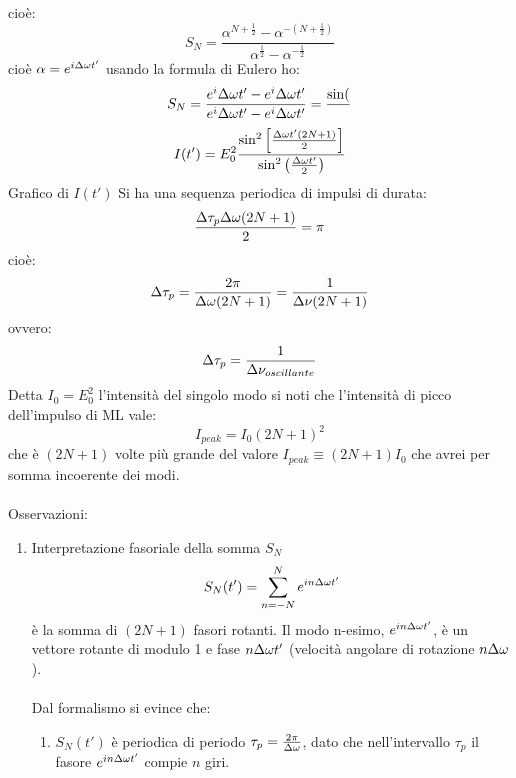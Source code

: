 \begin{enumerate}
cioè:
\begin{equation*}
S_N = \frac{\alpha^{N+\frac{1}{2}} - \alpha^{-(N+\frac{1}{2})}}{\alpha^\frac{1}{2} - \alpha^{-\frac{1}{2}}}
\end{equation*}
cioè $\alpha = e^{i\Delta \omega t'}$ usando la formula di Eulero ho:
\begin{equation*}
S_N = \frac{e^i\Delta \omega t' -e^i\Delta \omega t'}{e^i\Delta \omega t' - e^i\Delta \omega t'} = \frac{\sin(}{}
\end{equation*}
\begin{equation*}
I(t') = E_0^2 \frac{\sin^2 \left[\frac{\Delta \omega t' (2N+1)}{2}\right]}{\sin^2 \left(\frac{\Delta\omega t'}{2}\right)}
\end{equation*}
Grafico di $I(t')$
Si ha una sequenza periodica di impulsi di durata:
\begin{equation*}
\frac{\Delta\tau_p \Delta\omega (2N+1)}{2} = \pi
\end{equation*}
cioè:
\begin{equation*}
\Delta\tau_p = \frac{2\pi}{\Delta\omega (2N+1)} = \frac{1}{\Delta\nu(2N+1)}
\end{equation*}
ovvero:
\begin{equation*}
\Delta\tau_p = \frac{1}{\Delta\nu_{oscillante}}
\end{equation*}
Detta $I_0 = E_0^2$ l'intensità del singolo modo si noti che l'intensità di picco dell'impulso di ML vale:
\begin{equation*}
I_{peak} = I_0 (2N+1)^2
\end{equation*}
che è $(2N+1)$ volte più grande del valore $I_{peak} \equiv (2N+1) I_0$ che avrei per somma incoerente dei modi.\\
\\
Osservazioni:
\begin{enumerate}
\item Interpretazione fasoriale della somma $S_N$
\begin{equation*}
S_N(t') = \sum_{n=-N}^N e^{in\Delta\omega t'}
\end{equation*}
è la somma di $(2N+1)$ fasori rotanti.
Il modo n-esimo, $e^{in\Delta\omega t'}$, è un vettore rotante di modulo 1 e fase $n\Delta\omega t'$ (velocità angolare di rotazione $n\Delta\omega$).\\
\\
Dal formalismo si evince che:
\begin{enumerate}
\item $S_N(t')$ è periodica di periodo $\tau_p = \frac{2\pi}{\Delta\omega}$, dato che nell'intervallo $\tau_p$ il fasore $e^{in\Delta\omega t'}$ compie $n$ giri.

\end{enumerate}
\end{enumerate}
\end{enumerate}
